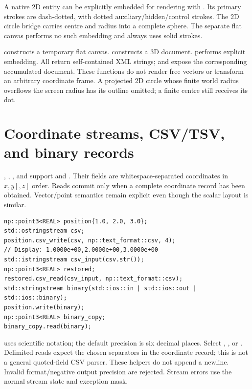 A native 2D entity can be explicitly embedded for rendering with
. Its primary strokes are dash-dotted, with
dotted auxiliary/hidden/control strokes. The 2D circle bridge carries centre
and radius into a complete sphere. The separate flat canvas performs no such
embedding and always uses solid strokes.

 constructs a temporary flat canvas.
 constructs a 3D document.
 performs explicit embedding. All
return self-contained XML strings;  and  expose
the corresponding accumulated document. These functions do not render free
vectors or transform an arbitrary coordinate frame. A projected 2D circle
whose finite world radius overflows the screen radius has its outline omitted;
a finite centre still receives its dot.

\section{Coordinate streams, CSV/TSV, and binary records}
, , , and  support
 and . Their fields are whitespace-separated
coordinates in $x,y[,z]$ order. Reads commit only when a complete coordinate
record has been obtained. Vector/point semantics remain explicit even though
the scalar layout is similar.

\begin{lstlisting}
np::point3<REAL> position{1.0, 2.0, 3.0};
std::ostringstream csv;
position.csv_write(csv, np::text_format::csv, 4);
// Display: 1.0000e+00,2.0000e+00,3.0000e+00
std::istringstream csv_input(csv.str());
np::point3<REAL> restored;
restored.csv_read(csv_input, np::text_format::csv);
std::stringstream binary(std::ios::in | std::ios::out | std::ios::binary);
position.write(binary);
np::point3<REAL> binary_copy;
binary_copy.read(binary);
\end{lstlisting}
 uses scientific notation;
the default precision is six decimal places. Select ,
, or . Delimited reads expect the chosen separators in the
coordinate record; this is not a general quoted-field CSV parser. These
helpers do not append a newline. Invalid format/negative output precision are
rejected. Stream errors use the normal stream state and exception mask.


